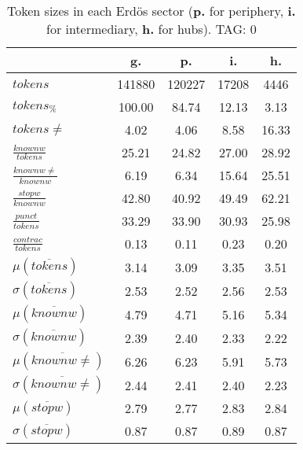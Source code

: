 \begin{table}[h!]
\begin{center}
\begin{tabular}{| l || c | c | c | c |}\hline
 & {\bf g.} & {\bf p.} & {\bf i.} & {\bf h.} \\\hline\hline
$tokens$ & 141880  & 120227  & 17208  & 4446 \\
$tokens_{\%}$ & 100.00  & 84.74  & 12.13  & 3.13 \\
$tokens \neq$ & 4.02  & 4.06  & 8.58  & 16.33 \\\hline
$\frac{knownw}{tokens}$ & 25.21  & 24.82  & 27.00  & 28.92 \\
$\frac{knownw \neq}{knownw}$ & 6.19  & 6.34  & 15.64  & 25.51 \\\hline
$\frac{stopw}{knownw}$ & 42.80  & 40.92  & 49.49  & 62.21 \\
$\frac{punct}{tokens}$ & 33.29  & 33.90  & 30.93  & 25.98 \\
$\frac{contrac}{tokens}$ & 0.13  & 0.11  & 0.23  & 0.20 \\\hline\hline
$\mu(\overline{tokens})$ & 3.14  & 3.09  & 3.35  & 3.51 \\
$\sigma(\overline{tokens})$ & 2.53  & 2.52  & 2.56  & 2.53 \\\hline
$\mu(\overline{knownw})$ & 4.79  & 4.71  & 5.16  & 5.34 \\
$\sigma(\overline{knownw})$ & 2.39  & 2.40  & 2.33  & 2.22 \\\hline
$\mu(\overline{knownw \neq})$ & 6.26  & 6.23  & 5.91  & 5.73 \\
$\sigma(\overline{knownw \neq})$ & 2.44  & 2.41  & 2.40  & 2.23 \\\hline
$\mu(\overline{stopw})$ & 2.79  & 2.77  & 2.83  & 2.84 \\
$\sigma(\overline{stopw})$ & 0.87  & 0.87  & 0.89  & 0.87 \\\hline
\end{tabular}
\caption{Token sizes in each Erd\"os sector ({{\bf p.}} for periphery, {{\bf i.}} for intermediary, {{\bf h.}} for hubs). TAG: 0}
\end{center}
\end{table}